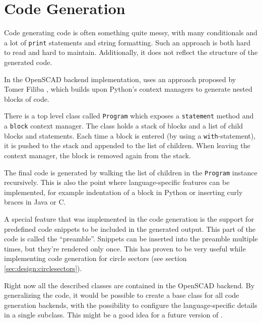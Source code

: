 
\section{Code Generation} \label{sec:design:codegen}

Code generating code is often something quite messy, with many conditionals and
a lot of \texttt{print} statements and string formatting. Such an approach is
both hard to read and hard to maintain. Additionally, it does not reflect the
structure of the generated code.

In the OpenSCAD backend implementation, \tangible{} uses an approach proposed by
Tomer Filiba \cite{filiba:2012}, which builds upon Python's context managers to
generate nested blocks of code.


There is a top level class called \texttt{Program} which exposes a
\texttt{statement} method and a \texttt{block} context manager. The class holds
a stack of blocks and a list of child blocks and statements. Each time a block
is entered (by using a \texttt{with}-statement), it is pushed to the stack and
appended to the list of children. When leaving the context manager, the block is
removed again from the stack.

The final code is generated by walking the list of children in the
\texttt{Program} instance recursively. This is also the point where
language-specific features can be implemented, for example indentation of a
block in Python or inserting curly braces in Java or C.

A special feature that was implemented in the code generation is the support for
predefined code snippets to be included in the generated output. This part of
the code is called the ``preamble''. Snippets can be inserted into the preamble
multiple times, but they're rendered only once. This has proven to be very
useful while implementing code generation for circle sectors (see section
\ref{sec:design:circlesectors}).

Right now all the described classes are contained in the OpenSCAD backend. By
generalizing the code, it would be possible to create a base class for all code
generation backends, with the possibility to configure the language-specific
details in a single subclass. This might be a good idea for a future version of
\tangible{}.

